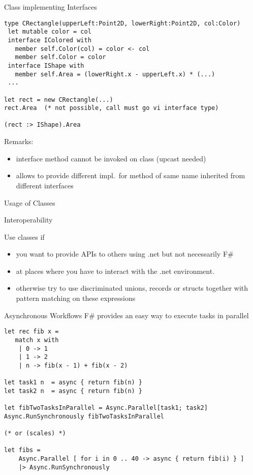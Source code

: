 \documentclass{beamer}
\newcommand{\Blue}[1]{\color{blue}#1\color{black}\xspace}
\begin{document}
\begin{frame}[fragile]{Class implementing Interfaces}
\begin{lstlisting}[basicstyle=\scriptsize]
type CRectangle(upperLeft:Point2D, lowerRight:Point2D, col:Color) 
 let mutable color = col
 interface IColored with
   member self.Color(col) = color <- col
   member self.Color = color
 interface IShape with
   member self.Area = (lowerRight.x - upperLeft.x) * (...)
 ...

let rect = new CRectangle(...)
rect.Area  (* not possible, call must go vi interface type)

(rect :> IShape).Area
\end{lstlisting}

Remarks:
\begin{overlayarea}{\textwidth}{0.3\textheight}
\begin{itemize}
\item<+-> interface method cannot be invoked on class (upcast needed)
\item<+-> allows to provide different impl.\ for method of same name
  inherited from different interfaces
\end{itemize}
\end{overlayarea}
\end{frame}

\begin{frame}[fragile]{Usage of Classes}

\Blue{Interoperability}

Use classes if 
\begin{itemize}
\item you want to provide APIs to others using \textsf{.net}
but not necessarily F\#
\item at places where you have to interact with the \textsf{.net}
  environment.
\item otherwise try to use discriminated unions, records or structs
  together with pattern matching on these expressions
\end{itemize}
\end{frame}

\begin{frame}[fragile]{Asynchronous Workflows}
\Blue{F\# provides an easy way to execute tasks in parallel}

\begin{lstlisting}[escapechar=\%]
let rec fib x =
   match x with
    | 0 -> 1
    | 1 -> 2
    | n -> fib(x - 1) + fib(x - 2)

let task1 n  = async { return fib(n) }
let task2 n  = async { return fib(n) }

let fibTwoTasksInParallel = Async.Parallel[task1; task2] 
Async.RunSynchronously fibTwoTasksInParallel

(* or (scales) *)

let fibs =
    Async.Parallel [ for i in 0 .. 40 -> async { return fib(i) } ]
    |> Async.RunSynchronously
\end{lstlisting}
\end{frame}
\end{document}
